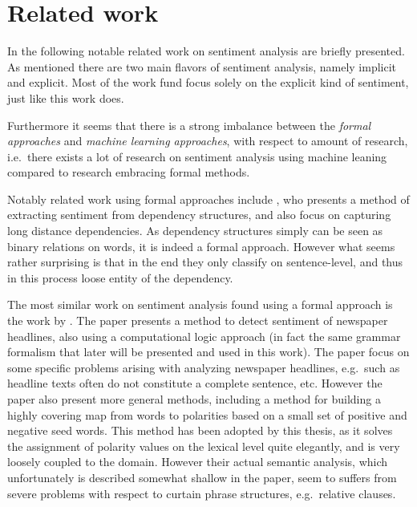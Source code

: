 \section{Related work}
\label{sec:relatedWork}
In the following notable related work on sentiment analysis are briefly presented. As mentioned there are two main flavors of sentiment analysis, namely implicit and explicit. Most of the work fund focus solely on the explicit kind of sentiment, just like this work does. 

Furthermore it seems that there is a strong imbalance between the \emph{formal approaches} and \emph{machine learning approaches}, with respect to amount of research, i.e.\ there exists a lot of research on sentiment analysis using machine leaning compared to research embracing formal methods. 


Notably related work using formal approaches include \citeauthor{dependencySentiment} , who presents a method of extracting sentiment from dependency structures, and also focus on capturing long distance dependencies. As dependency structures simply can be seen as binary relations on words, it is indeed a formal approach. However what seems rather surprising is that in the end they only classify on sentence-level, and thus in this process loose entity of the dependency.

The most similar work on sentiment analysis found using a formal approach is the work by \citeauthor{valenceShifting} . The paper presents a method to detect sentiment of newspaper headlines, also using a computational logic approach (in fact the same grammar formalism that later will be presented and used in this work). The paper focus on some specific problems arising with analyzing newspaper headlines, e.g.\ such as headline texts often do not constitute a complete sentence, etc. However the paper also present more general methods, including a method for building a highly covering map from words to polarities based on a small set of positive and negative seed words. This method has been adopted by this thesis, as it solves the assignment of polarity values on the lexical level quite elegantly, and is very loosely coupled to the domain. However their actual semantic analysis, which unfortunately is described somewhat shallow in the paper, seem to suffers from severe problems with respect to curtain phrase structures, e.g.\ relative clauses.


